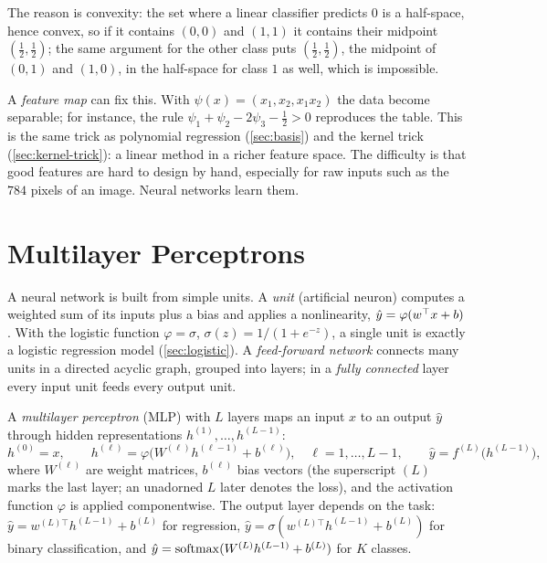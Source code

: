 \noindent The reason is convexity: the set where a linear classifier predicts $0$ is a half-space, hence convex, so if it contains $(0,0)$ and $(1,1)$ it contains their midpoint $(\frac12,\frac12)$; the same argument for the other class puts $(\frac12,\frac12)$, the midpoint of $(0,1)$ and $(1,0)$, in the half-space for class $1$ as well, which is impossible.

A \emph{feature map} can fix this. With $\psi(x)=(x_1,x_2,x_1x_2)$ the data become separable; for instance, the rule $\psi_1+\psi_2-2\psi_3-\frac12>0$ reproduces the table. This is the same trick as polynomial regression (\cref{sec:basis}) and the kernel trick (\cref{sec:kernel-trick}): a linear method in a richer feature space. The difficulty is that good features are hard to design by hand, especially for raw inputs such as the $784$ pixels of an image. Neural networks learn them.

\section{Multilayer Perceptrons}\label{sec:mlp}

A neural network is built from simple units. A \emph{unit} (artificial neuron) computes a weighted sum of its inputs plus a bias and applies a nonlinearity, $\hat y=\varphi(w^{\top} x+b)$. With the logistic function $\varphi=\sigma$, $\sigma(z)=1/(1+e^{-z})$, a single unit is exactly a logistic regression model (\cref{sec:logistic}). A \emph{feed-forward network} connects many units in a directed acyclic graph, grouped into layers; in a \emph{fully connected} layer every input unit feeds every output unit.

\begin{definition}\label{def:mlp}
A \emph{multilayer perceptron} (MLP) with $L$ layers maps an input $x$ to an output $\hat y$ through hidden representations $h^{(1)},\dots,h^{(L-1)}$:
\[
h^{(0)}=x,\qquad h^{(\ell)}=\varphi\big(W^{(\ell)}h^{(\ell-1)}+b^{(\ell)}\big),\quad \ell=1,\dots,L-1,\qquad \hat y=f^{(L)}\big(h^{(L-1)}\big),
\]
where $W^{(\ell)}$ are weight matrices, $b^{(\ell)}$ bias vectors (the superscript $(L)$ marks the last layer; an unadorned $L$ later denotes the loss), and the activation function $\varphi$ is applied componentwise. The output layer depends on the task: $\hat y=w^{(L)\top}h^{(L-1)}+b^{(L)}$ for regression, $\hat y=\sigma(w^{(L)\top}h^{(L-1)}+b^{(L)})$ for binary classification, and $\hat y=\operatorname{softmax}(W^{(L)}h^{(L-1)}+b^{(L)})$ for $K$ classes.
\end{definition}

